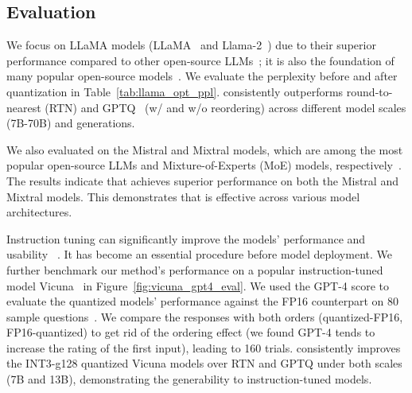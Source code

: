 \subsection{Evaluation}





We focus on LLaMA models (LLaMA~\cite{touvron2023llama} and Llama-2~\cite{touvron2023llama2}) due to their superior performance compared to other open-source LLMs~\cite{opt, scao2022bloom}; it is also the foundation of many popular open-source models~\cite{alpaca, vicuna2023}. We evaluate the perplexity before and after quantization in Table~\ref{tab:llama_opt_ppl}. 
\methodshort consistently outperforms round-to-nearest (RTN) and GPTQ~\cite{frantar2022gptq} (w/ and w/o reordering) across different model scales (7B-70B) and generations. 

We also evaluated \methodshort on the Mistral and Mixtral models, which are among the most popular open-source LLMs and Mixture-of-Experts (MoE) models, respectively~\cite{jiang2023mistral, jiang2024mixtral}. The results indicate that \methodshort achieves superior performance on both the Mistral and Mixtral models. This demonstrates that \methodshort is effective across various model architectures.










Instruction tuning can significantly improve the models' performance and usability 
~\cite{wei2021finetuned,sanh2021multitask,ouyang2022training,chung2022scaling}. It has become an essential procedure before model deployment. We further benchmark our method's performance on a popular instruction-tuned model Vicuna~\cite{vicuna2023} in Figure~\ref{fig:vicuna_gpt4_eval}. We used the GPT-4 score to evaluate the quantized models' performance against the FP16 counterpart on 80 sample questions~\cite{vicuna2023}.
We compare the responses with both orders (quantized-FP16, FP16-quantized) to get rid of the ordering effect (we found GPT-4 tends to increase the rating of the first input), leading to 160 trials. 
\methodshort consistently improves the INT3-g128 quantized Vicuna models over RTN and GPTQ under both scales (7B and 13B), demonstrating the generability to instruction-tuned models.  



